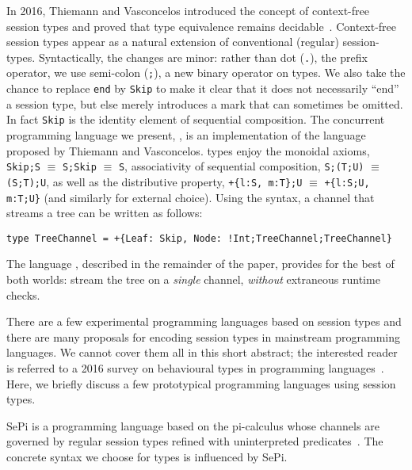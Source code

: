 In 2016, Thiemann and Vasconcelos introduced the concept of
context-free session types and proved that type equivalence remains
decidable~\cite{DBLP:conf/icfp/ThiemannV16}.
%
Context-free session types appear as a natural extension of
conventional (regular) session-types. Syntactically, the changes are
minor: rather than dot (\lstinline|.|), the prefix operator, we use
semi-colon (\lstinline|;|), a new binary operator on types. We also
take the chance to replace \lstinline [morekeywords=end]|end| by
\lstinline|Skip| to make it clear that it does not necessarily ``end''
a session type, but else merely introduces a mark that can sometimes
be omitted. In fact \lstinline|Skip| is the identity element of
sequential composition. The concurrent programming language
we present, \freest, is an implementation of the
language proposed by Thiemann and Vasconcelos.
\freest{} types enjoy the monoidal axioms,
\lstinline|Skip;S| $\equiv$ \lstinline|S;Skip| $\equiv$ \lstinline|S|,
associativity of sequential composition, \lstinline|S;(T;U)| $\equiv$
\lstinline|(S;T);U|, as well as the distributive property,
%
\lstinline|+{l:S, m:T};U| $\equiv$ \lstinline|+{l:S;U, m:T;U}| (and
similarly for external choice).
%
Using the \freest{} syntax, a channel that streams a tree can be
written as follows:
%
\begin{lstlisting}
type TreeChannel = +{Leaf: Skip, Node: !Int;TreeChannel;TreeChannel}
\end{lstlisting}

The language \freest, described in the remainder of the paper, 
provides for the best
of both worlds: stream the tree on a \emph{single} channel,
\emph{without} extraneous runtime checks.


There are a few experimental programming languages based on session
types and there are many proposals for encoding session types in
mainstream programming languages. We cannot cover them all in
this short abstract; the interested reader is referred to a 2016
survey on behavioural types in programming
languages~\cite{DBLP:journals/ftpl/AnconaBB0CDGGGH16}.  Here, we briefly
discuss a few prototypical programming languages using session types.

SePi is a programming language based on the pi-calculus whose channels
are governed by regular session types refined with uninterpreted
predicates~\cite{DBLP:conf/sefm/FrancoV13}. The concrete syntax we
choose for \freest{} types is influenced by SePi.

